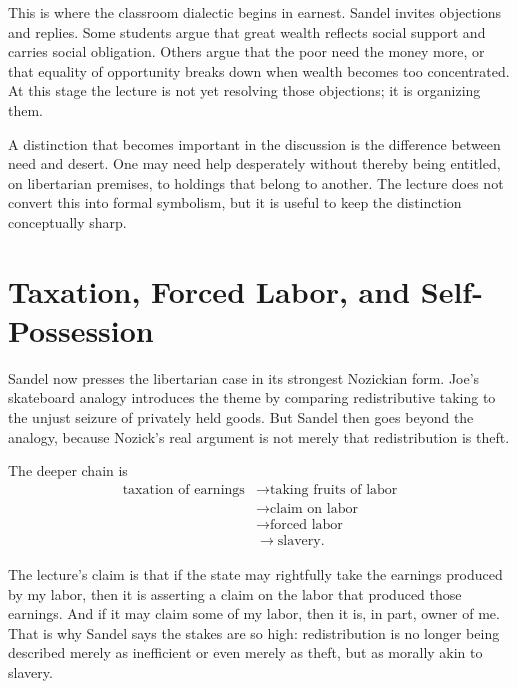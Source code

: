 This is where the classroom dialectic begins in earnest. Sandel invites objections and replies. Some students argue that great wealth reflects social support and carries social obligation. Others argue that the poor need the money more, or that equality of opportunity breaks down when wealth becomes too concentrated. At this stage the lecture is not yet resolving those objections; it is organizing them.

A distinction that becomes important in the discussion is the difference between need and desert. One may need help desperately without thereby being entitled, on libertarian premises, to holdings that belong to another. The lecture does not convert this into formal symbolism, but it is useful to keep the distinction conceptually sharp.

\section{Taxation, Forced Labor, and Self-Possession}

Sandel now presses the libertarian case in its strongest Nozickian form. Joe's skateboard analogy introduces the theme by comparing redistributive taking to the unjust seizure of privately held goods. But Sandel then goes beyond the analogy, because Nozick's real argument is not merely that redistribution is theft.

The deeper chain is
\begin{align}
\text{taxation of earnings}
&\to \text{taking fruits of labor} \\
&\to \text{claim on labor} \\
&\to \text{forced labor} \\
&\to \text{slavery}.
\end{align}

The lecture's claim is that if the state may rightfully take the earnings produced by my labor, then it is asserting a claim on the labor that produced those earnings. And if it may claim some of my labor, then it is, in part, owner of me. That is why Sandel says the stakes are so high: redistribution is no longer being described merely as inefficient or even merely as theft, but as morally akin to slavery.

\begin{figure}
\centering
{}
\end{figure}

